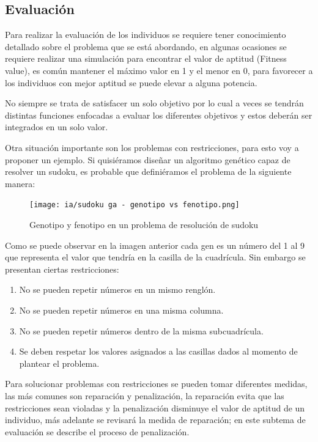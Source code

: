 \documentclass[11pt,fleqn]{book} %
\begin{document}
\subsection{Evaluación}

Para realizar la evaluación de los individuos se requiere tener conocimiento detallado sobre el problema que se está abordando, en algunas ocasiones se requiere realizar una simulación para encontrar el valor de aptitud (Fitness value), es común mantener el máximo valor en 1 y el menor en 0, para favorecer a los individuos con mejor aptitud se puede elevar a alguna potencia.

No siempre se trata de satisfacer un solo objetivo por lo cual a veces se tendrán distintas funciones enfocadas a evaluar los diferentes objetivos y estos deberán ser integrados en un solo valor.

Otra situación importante son los problemas con restricciones, para esto voy a proponer un ejemplo. Si quisiéramos diseñar un algoritmo genético capaz de resolver un sudoku, es probable que definiéramos el problema de la siguiente manera:

\begin{figure}[ht]
\centering\texttt{[image: ia/sudoku ga - genotipo vs fenotipo.png]}
\caption{Genotipo y fenotipo en un problema de resolución de sudoku}
\label{fig:sudoku-gen-fen} 
\end{figure}

Como se puede observar en la imagen anterior cada gen es un número del 1 al 9 que representa el valor que tendría en la casilla de la cuadrícula. Sin embargo se presentan ciertas restricciones:

\begin{enumerate}
\item No se pueden repetir números en un mismo renglón.
\item No se pueden repetir números en una misma columna.
\item No se pueden repetir números dentro de la misma subcuadrícula.
\item Se deben respetar los valores asignados a las casillas dados al momento 
	de plantear el problema.
\end{enumerate}

Para solucionar problemas con restricciones se pueden tomar diferentes medidas, las más comunes son reparación y penalización, la reparación evita que las restricciones sean violadas y la penalización disminuye el valor de aptitud de un individuo, más adelante se revisará la medida de reparación; en este subtema de evaluación se describe el proceso de penalización.
\end{document}
